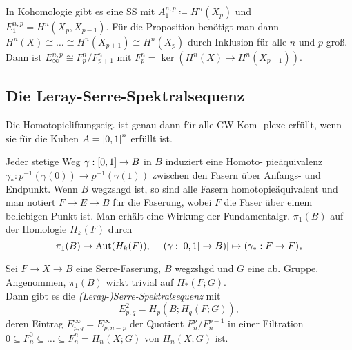 \documentclass{cheat-sheet}
\newcommand{\nacong}{\!\cong\!} %
\newenvironment{centertikzcd}
  {\begin{center}\begin{tikzcd}}
  {\end{tikzcd}\end{center}}
\begin{document}
\begin{bem}
  In Kohomologie gibt es eine SS mit $A^{n,p}_1 \coloneqq H^n(X_p)$ und $E^{n,p}_1 = H^n(X_p, X_{p-1})$. Für die Proposition benötigt man dann $H^n(X) \nacong \ldots \nacong H^n(X_{p+1}) \nacong H^n(X_p)$ durch Inklusion für alle $n$ und $p$ groß. Dann ist $E^{n,p}_\infty \cong F^n_p / F^n_{p+1}$ mit $F^n_p \!=\! \ker(H^n(X) \!\to\! H^n(X_{p-1}))$.
\end{bem}

\subsection{Die Leray-Serre-Spektralsequenz}


\begin{lem}
  Die Homotopieliftungseig. ist genau dann für alle CW-Kom- plexe erfüllt, wenn sie für die Kuben $A = \left[ 0, 1 \right]^n$ erfüllt ist.
\end{lem}

\begin{bem}
  Jeder stetige Weg $\gamma : \left[ 0, 1 \right] \to B$ in $B$ induziert eine Homoto- pieäquivalenz $\gamma_* : p^{-1}(\gamma(0)) \to p^{-1}(\gamma(1))$ zwischen den Fasern über Anfangs- und Endpunkt.
  Wenn $B$ wegzshgd ist, so sind alle Fasern homotopieäquivalent und man notiert $F \to E \to B$ für die Faserung, wobei $F$ die Faser über einem beliebigen Punkt ist. Man erhält eine Wirkung der Fundamentalgr. $\pi_1(B)$ auf der Homologie $H_k(F)$ durch
  \[ \pi_1(B) \to \operatorname{Aut}(H_k(F)), \quad [(\gamma : \left[ 0, 1 \right] \to B)] \mapsto (\gamma_* : F \to F)_* \]
\end{bem}

\begin{thm}
  Sei $F \to X \to B$ eine Serre-Faserung, $B$ wegzshgd und $G$ eine ab. Gruppe. Angenommen, $\pi_1(B)$ wirkt trivial auf $H_*(F; G)$. \\
  Dann gibt es die \emph{(Leray-)Serre-Spektralsequenz} mit
  \[ E^2_{p,q} = H_p(B; H_q(F; G)), \]
  deren Eintrag $E^\infty_{p,q} = E^\infty_{p,n-p}$ der Quotient $F^p_n/F^{p-1}_n$ in einer Filtration
  $0 \subseteq F_n^0 \subseteq \ldots \subseteq F_n^n = H_n(X; G)$ von $H_n(X; G)$ ist.
\end{thm}
\end{document}

